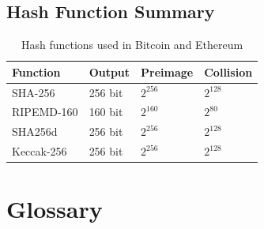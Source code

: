 \documentclass[12pt,a4paper,openany]{book}
\theoremstyle{definition}
\theoremstyle{plain}
\theoremstyle{remark}
\begin{document}
\section{Hash Function Summary}

\begin{table}[h]
\centering
\caption{Hash functions used in Bitcoin and Ethereum}
\begin{tabular}{llll}
\toprule
\textbf{Function} & \textbf{Output} & \textbf{Preimage} & \textbf{Collision} \\
\midrule
SHA-256       & 256 bit & $2^{256}$ & $2^{128}$ \\
RIPEMD-160    & 160 bit & $2^{160}$ & $2^{80}$  \\
SHA256d       & 256 bit & $2^{256}$ & $2^{128}$ \\
Keccak-256    & 256 bit & $2^{256}$ & $2^{128}$ \\
\bottomrule
\end{tabular}
\end{table}


\chapter{Glossary}
\end{document}
